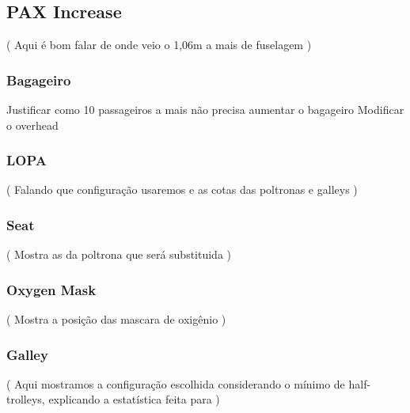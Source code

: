 \subsection{PAX Increase}
( Aqui é bom falar de onde veio o 1,06m a mais de fuselagem )
\subsubsection{Bagageiro}
		Justificar como 10 passageiros a mais não precisa aumentar o bagageiro
		Modificar o overhead
\subsubsection{LOPA} ( Falando que configuração usaremos e as cotas das poltronas e galleys )
\subsubsection{Seat}
    ( Mostra as da poltrona que será substituida )
\subsubsection{Oxygen Mask}
( Mostra a posição das mascara de oxigênio )
\subsubsection{Galley}	
( Aqui mostramos a configuração escolhida considerando o mínimo de half-trolleys, explicando a estatística feita para  )